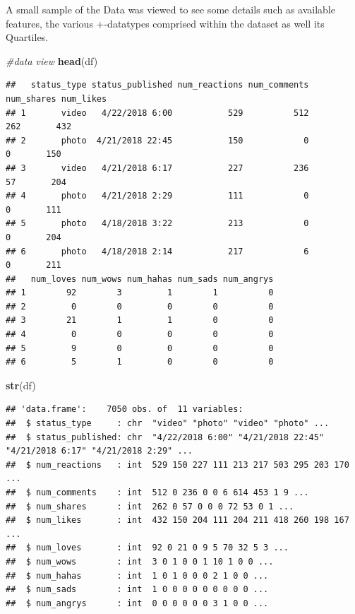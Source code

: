 \documentclass[
]{article}
\newenvironment{Shaded}{\begin{snugshade}}{\end{snugshade}}
\newcommand{\CommentTok}[1]{\textcolor[rgb]{0.56,0.35,0.01}{\textit{#1}}}
\newcommand{\FunctionTok}[1]{\textcolor[rgb]{0.13,0.29,0.53}{\textbf{#1}}}
\newcommand{\NormalTok}[1]{#1}
\begin{document}
A small sample of the Data was viewed to see some details such as
available features, the various +-datatypes comprised within the dataset
as well its Quartiles.

\begin{Shaded}
\begin{Highlighting}[]
\CommentTok{\#data view}
\FunctionTok{head}\NormalTok{(df)}
\end{Highlighting}
\end{Shaded}

\begin{verbatim}
##   status_type status_published num_reactions num_comments num_shares num_likes
## 1       video   4/22/2018 6:00           529          512        262       432
## 2       photo  4/21/2018 22:45           150            0          0       150
## 3       video   4/21/2018 6:17           227          236         57       204
## 4       photo   4/21/2018 2:29           111            0          0       111
## 5       photo   4/18/2018 3:22           213            0          0       204
## 6       photo   4/18/2018 2:14           217            6          0       211
##   num_loves num_wows num_hahas num_sads num_angrys
## 1        92        3         1        1          0
## 2         0        0         0        0          0
## 3        21        1         1        0          0
## 4         0        0         0        0          0
## 5         9        0         0        0          0
## 6         5        1         0        0          0
\end{verbatim}

\begin{Shaded}
\begin{Highlighting}[]
\FunctionTok{str}\NormalTok{(df)}
\end{Highlighting}
\end{Shaded}

\begin{verbatim}
## 'data.frame':    7050 obs. of  11 variables:
##  $ status_type     : chr  "video" "photo" "video" "photo" ...
##  $ status_published: chr  "4/22/2018 6:00" "4/21/2018 22:45" "4/21/2018 6:17" "4/21/2018 2:29" ...
##  $ num_reactions   : int  529 150 227 111 213 217 503 295 203 170 ...
##  $ num_comments    : int  512 0 236 0 0 6 614 453 1 9 ...
##  $ num_shares      : int  262 0 57 0 0 0 72 53 0 1 ...
##  $ num_likes       : int  432 150 204 111 204 211 418 260 198 167 ...
##  $ num_loves       : int  92 0 21 0 9 5 70 32 5 3 ...
##  $ num_wows        : int  3 0 1 0 0 1 10 1 0 0 ...
##  $ num_hahas       : int  1 0 1 0 0 0 2 1 0 0 ...
##  $ num_sads        : int  1 0 0 0 0 0 0 0 0 0 ...
##  $ num_angrys      : int  0 0 0 0 0 0 3 1 0 0 ...
\end{verbatim}
\end{document}
